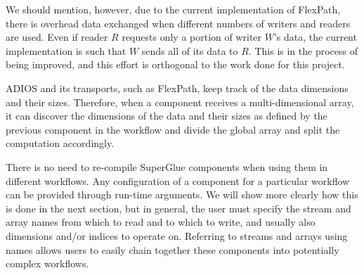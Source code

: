 We should mention, however, due to the current implementation of FlexPath, there is overhead
data exchanged when different numbers of writers and readers are used. Even if
reader $R$ requests only a portion of writer $W$'s data, the current implementation
is such that $W$ sends all of its data to $R$. This is in the process of being
improved, and this effort is orthogonal to the work done for this project.
\fi

ADIOS and its transports, such as FlexPath,
keep track of the
data dimensions and their sizes. Therefore, when a
component receives a
multi-dimensional array, it can discover the dimensions
of the data and their
sizes as defined by the previous component
in the workflow and divide the global array
and split the computation accordingly.

There is no need to re-compile SuperGlue components when using them
in different workflows. Any configuration
of a component for a particular workflow
can be provided through run-time arguments.
We will show more clearly how this is done in the next section,
but in general, the user must specify the
stream and array names from which to read
and to which to write,
and usually also dimensions and/or
indices to operate on.
Referring to
streams and arrays using names allows users to
easily chain together these
components into potentially complex workflows.
